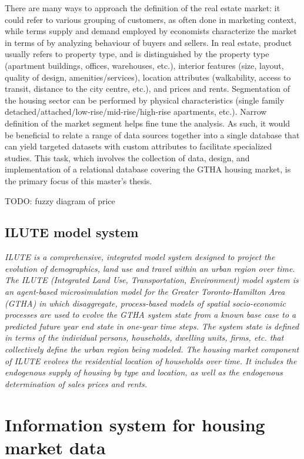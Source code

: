 There are many ways to approach the definition of the real estate market: it could refer to various grouping of customers, as often done in marketing context, while terms supply and demand employed by economists characterize the market in terms of by analyzing behaviour of buyers and sellers.
In real estate, product usually refers to property type, and is distinguished by the property type (apartment buildings, offices, warehouses, etc.), interior features (size, layout, quality of design, amenities/services), location attributes (walkability, access to transit, distance to the city centre, etc.), and prices and rents.
Segmentation of the housing sector can be performed by physical characteristics (single family detached/attached/low-rise/mid-rise/high-rise apartments, etc.).
Narrow definition of the market segment helps fine tune the analysis.\cite{Brett2009}
As such, it would be beneficial to relate a range of data sources together into a single database that can yield targeted datasets with custom attributes to facilitate specialized studies.
This task, which involves the collection of data, design, and implementation of a relational database covering the GTHA housing market, is the primary focus of this master's thesis.

TODO: fuzzy diagram of price

\subsection{ILUTE model system} \label{subsec:ilute}

\textit{ILUTE is a comprehensive, integrated model system designed to project the evolution of demographics, land use and travel within an urban region over time.
The ILUTE (Integrated Land Use, Transportation, Environment) model system is an agent-based microsimulation model for the Greater Toronto-Hamilton Area (GTHA) in which disaggregate, process-based models of spatial socio-economic processes are used to evolve the GTHA system state from a known base case to a predicted future year end state in one-year time steps.
The system state is defined in terms of the individual persons, households, dwelling units, firms, etc.
that collectively define the urban region being modeled.
The housing market component of ILUTE evolves the residential location of households over time.
It includes the endogenous supply of housing by type and location, as well as the endogenous determination of sales prices and rents.}\cite{Miller2010}

\section{Information system for housing market data} \label{sec:information_system_for_housing_market_data}

